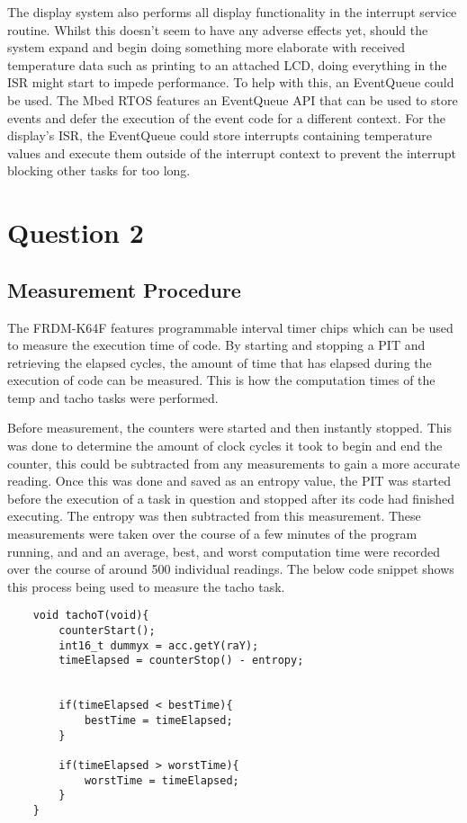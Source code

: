 \documentclass[]{report}
\begin{document}
		The display system also performs all display functionality in the interrupt service routine. Whilst this doesn't seem to have any adverse effects yet, should the system expand and begin doing something more elaborate with received temperature data such as printing to an attached LCD, doing everything in the ISR might start to impede performance. To help with this, an EventQueue could be used. The Mbed RTOS features an EventQueue API\cite{mbedoseventqueue} that can be used to store events and defer the execution of the event code for a different context. For the display's ISR, the EventQueue could store interrupts containing temperature values and execute them outside of the interrupt context to prevent the interrupt blocking other tasks for too long.
		
		\section{Question 2}
			\subsection{Measurement Procedure}
			The FRDM-K64F features programmable interval timer chips which can be used to measure the execution time of code. By starting and stopping a PIT and retrieving the elapsed cycles, the amount of time that has elapsed during the execution of code can be measured. This is how the computation times of the temp and tacho tasks were performed. 
			\medskip
			
			Before measurement, the counters were started and then instantly stopped. This was done to determine the amount of clock cycles it took to begin and end the counter, this could be subtracted from any measurements to gain a more accurate reading. Once this was done and saved as an entropy value, the PIT was started before the execution of a task in question and stopped after its code had finished executing. The entropy was then subtracted from this measurement. These measurements were taken over the course of a few minutes of the program running, and and an average, best, and worst computation time were recorded over the course of around 500 individual readings. The below code snippet shows this process being used to measure the tacho task.
			\begin{lstlisting}
	void tachoT(void){
		counterStart();
		int16_t dummyx = acc.getY(raY);
		timeElapsed = counterStop() - entropy;
			
			
		if(timeElapsed < bestTime){
			bestTime = timeElapsed;
		}
			
		if(timeElapsed > worstTime){
			worstTime = timeElapsed;
		}		
	}
			\end{lstlisting}
			
\end{document}

